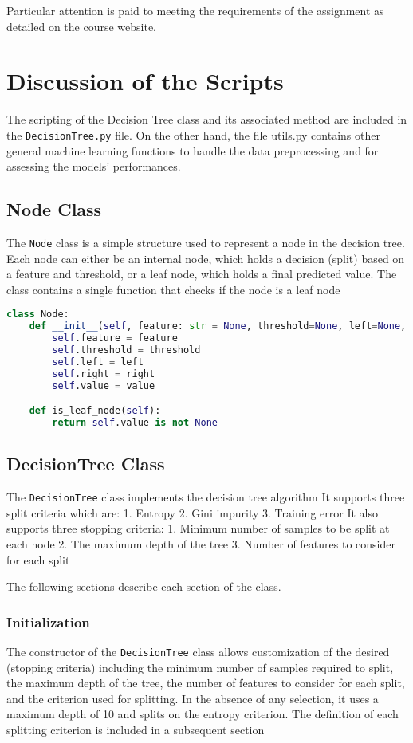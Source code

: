 \documentclass{article}
\begin{document}
Particular attention is paid to meeting the requirements of the assignment as detailed on the course website.

\section{Discussion of the Scripts}
The scripting of the Decision Tree class and its associated method are included in the \texttt{DecisionTree.py} file. On the other hand, the file utils.py contains other general machine learning functions to handle the data preprocessing and for assessing the models' performances.

\subsection{Node Class}
The \texttt{Node} class is a simple structure used to represent a node in the decision tree. Each node can either be an internal node, which holds a decision (split) based on a feature and threshold, or a leaf node, which holds a final predicted value. The class contains a single function that checks if the node is a leaf node

\begin{lstlisting}[language=Python, caption=Node Class]
class Node:
    def __init__(self, feature: str = None, threshold=None, left=None, right=None, *, value=None):
        self.feature = feature
        self.threshold = threshold
        self.left = left
        self.right = right
        self.value = value

    def is_leaf_node(self):
        return self.value is not None
\end{lstlisting}

\subsection{DecisionTree Class}
The \texttt{DecisionTree} class implements the decision tree algorithm It supports three split criteria which are:
1. Entropy
2. Gini impurity
3. Training error
It also supports three stopping criteria:
1. Minimum number of samples to be split at each node
2. The maximum depth of the tree
3. Number of features to consider for each split

The following sections describe each section of the class.

\subsubsection{Initialization}
The constructor of the \texttt{DecisionTree} class allows customization of the desired (stopping criteria) including the minimum number of samples required to split, the maximum depth of the tree, the number of features to consider for each split, and the criterion used for splitting. In the absence of any selection, it uses a maximum depth of 10 and splits on the entropy criterion. The definition of each splitting criterion is included in a subsequent section
\end{document}
